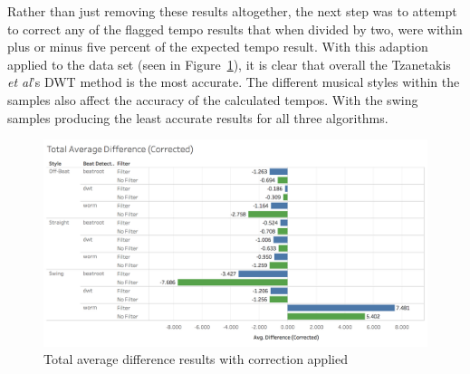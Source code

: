 \documentclass[a4paper, 11pt]{article}
\begin{document}
Rather than just removing these results altogether, the next step was to attempt to correct any of the flagged tempo results that when divided by two, were within plus or minus five percent of the expected tempo result. With this adaption applied to the data set (seen in Figure~\ref{fig: corAveDiff}), it is clear that overall the Tzanetakis \textit{et al}'s \cite{tzane1} DWT method is the most accurate. The different musical styles within the samples also affect the accuracy of the calculated tempos. With the swing samples producing the least accurate results for all three algorithms.


\begin{figure}[htbp]
\centering
\includegraphics[scale=0.25]{images/totAveDiffCor.jpg}
\caption{Total average difference results with correction applied}
\label{fig: corAveDiff}
\end{figure}



\end{document}
